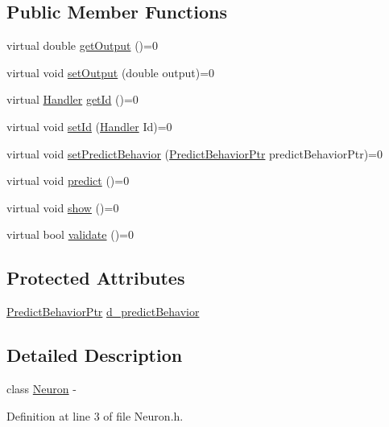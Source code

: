 \subsection*{Public Member Functions}
\begin{DoxyCompactItemize}
\item 
virtual double \hyperlink{class_neuron_a43ac0c8461c610bb2b82017d597435e3}{getOutput} ()=0
\item 
virtual void \hyperlink{class_neuron_aae94f78cfa7ed3ce4935f23a3a585f95}{setOutput} (double output)=0
\item 
virtual \hyperlink{_a_m_o_r_e_8h_abc871abb71cff6655b8172ee7240b8ef}{Handler} \hyperlink{class_neuron_a1a34edd39fba70be1d18219d5e9e1eea}{getId} ()=0
\item 
virtual void \hyperlink{class_neuron_a65331c891ac34a344d0bb791073a8dd9}{setId} (\hyperlink{_a_m_o_r_e_8h_abc871abb71cff6655b8172ee7240b8ef}{Handler} Id)=0
\item 
virtual void \hyperlink{class_neuron_af21848d0ef33bec5587e4c2702c83e3f}{setPredictBehavior} (\hyperlink{_a_m_o_r_e_8h_a1fb2f1f8fdf1e08c42ef4bdce436af93}{PredictBehaviorPtr} predictBehaviorPtr)=0
\item 
virtual void \hyperlink{class_neuron_a7181d8d0a5f9b0e4ff39410785f087e9}{predict} ()=0
\item 
virtual void \hyperlink{class_neuron_ae18a86f9b67c63a6fcb28c813b47a38d}{show} ()=0
\item 
virtual bool \hyperlink{class_neuron_a37f57f44fefa328ea0b7ab32b52c853e}{validate} ()=0
\end{DoxyCompactItemize}
\subsection*{Protected Attributes}
\begin{DoxyCompactItemize}
\item 
\hyperlink{_a_m_o_r_e_8h_a1fb2f1f8fdf1e08c42ef4bdce436af93}{PredictBehaviorPtr} \hyperlink{class_neuron_a2522e221f58c84bd3a1c32647da4a411}{d\_\-predictBehavior}
\end{DoxyCompactItemize}


\subsection{Detailed Description}
class \hyperlink{class_neuron}{Neuron} -\/ 

Definition at line 3 of file Neuron.h.



